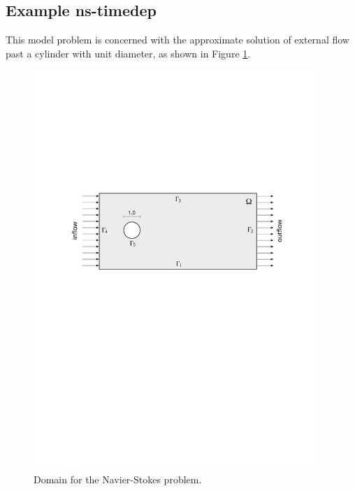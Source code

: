 \documentclass[11pt]{article}
\begin{document}

\subsection{Example ns-timedep}\label{sec:ns-timedep}

This model problem is concerned with the approximate solution of external
flow past a cylinder with unit diameter, as shown in Figure \ref{cylinderdomain}.

\begin{figure}[!ht]
  \medskip \centering
  \includegraphics[width=0.95\textwidth]{img/cylinder}
  \caption{Domain for the Navier-Stokes problem.}
  \label{cylinderdomain}
\end{figure}
\end{document}
